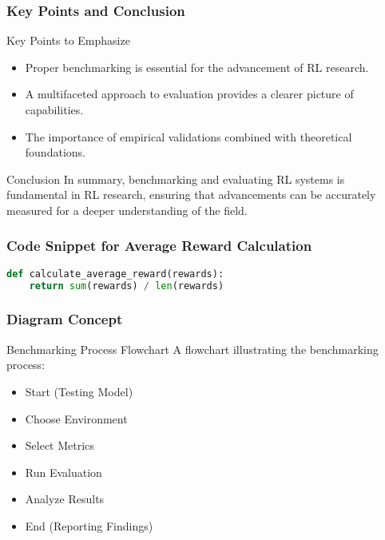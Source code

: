 \documentclass{beamer}
\begin{document}
\begin{frame}[fragile]
    \frametitle{Key Points and Conclusion}
    \begin{block}{Key Points to Emphasize}
        \begin{itemize}
            \item Proper benchmarking is essential for the advancement of RL research.
            \item A multifaceted approach to evaluation provides a clearer picture of capabilities.
            \item The importance of empirical validations combined with theoretical foundations.
        \end{itemize}
    \end{block}

    \begin{block}{Conclusion}
        In summary, benchmarking and evaluating RL systems is fundamental in RL research, ensuring that advancements can be accurately measured for a deeper understanding of the field.
    \end{block}
\end{frame}

\begin{frame}[fragile]
    \frametitle{Code Snippet for Average Reward Calculation}
    \begin{lstlisting}[language=Python]
def calculate_average_reward(rewards):
    return sum(rewards) / len(rewards)
    \end{lstlisting}
\end{frame}

\begin{frame}[fragile]
    \frametitle{Diagram Concept}
    \begin{block}{Benchmarking Process Flowchart}
        A flowchart illustrating the benchmarking process:
        \begin{itemize}
            \item Start (Testing Model) 
            \item Choose Environment 
            \item Select Metrics 
            \item Run Evaluation 
            \item Analyze Results 
            \item End (Reporting Findings)
        \end{itemize}
    \end{block}
\end{frame}
\end{document}
